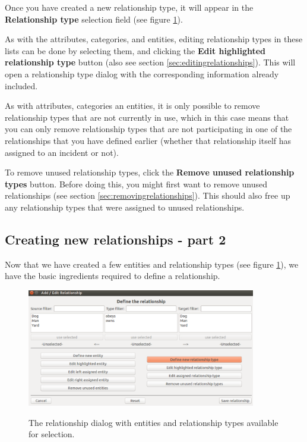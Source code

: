 \documentclass{memoir}
\begin{document}
Once you have created a new relationship type, it will appear in the \textbf{Relationship type} selection field (see figure \ref{fig:relationshipdialog2}).

As with the attributes, categories, and entities, editing relationship types in these lists can be done by selecting them, and clicking the \textbf{Edit highlighted relationship type} button (also see section \ref{sec:editingrelationships}). This will open a relationship type dialog with the corresponding information already included. 

As with attributes, categories an entities, it is only possible to remove relationship types that are not currently in use, which in this case means that you can only remove relationship types that are not participating in one of the relationships that you have defined earlier (whether that relationship itself has assigned to an incident or not).

To remove unused relationship types, click the \textbf{Remove unused relationship types} button. Before doing this, you might first want to remove unused relationships (see section \ref{sec:removingrelationships}). This should also free up any relationship types that were assigned to unused relationships.

\subsection{Creating new relationships - part 2}
\label{sec:creatingnewrelationships2}

Now that we have created a few entities and relationship types (see figure \ref{fig:relationshipdialog2}), we have the basic ingredients required to define a relationship.

\begin{figure}[h!]
  \centering
  \caption{The relationship dialog with entities and relationship types available for selection.}
  \includegraphics[width=100mm]{Screenshot_18.pdf}
  \label{fig:relationshipdialog2}
\end{figure}
\end{document}
